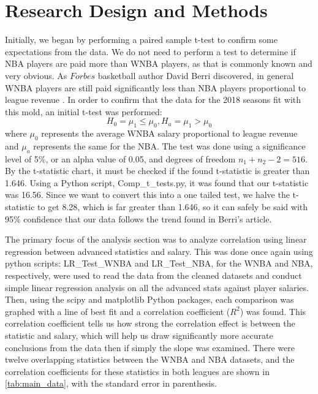 \documentclass[12pt, titlepage]{article}
\begin{document}
\section{Research Design and Methods}
\hspace*{10mm}
Initially, we began by performing a paired sample t-test to confirm some expectations from the data. We do not need to perform a test to 
determine if NBA players are paid more than WNBA players, as that is commonly known and very obvious. As $\textit{Forbes}$ basketball author David Berri 
discovered, in general WNBA players are still paid significantly less than NBA players proportional to league revenue \citep{WNBA_Revenue}. In order to 
confirm that the data for the 2018 seasons fit with this mold, an initial t-test was performed:
$$H_0 = \mu_1 \leq \mu_0, H_a = \mu_1 > \mu_0$$
where $\mu_0$ represents the average WNBA salary proportional to league revenue and $\mu_a$ represents the same for the NBA. The test was done using a 
significance level of  5\%, or an alpha value of 0.05, and degrees of freedom $n_1 + n_2 - 2 = 516$. By the t-statistic chart, it must be checked if the 
found t-statistic is greater than 1.646. Using a Python script, Comp\_t\_tests.py, it was found that our t-statistic was 16.56. Since we want to convert 
this into a one tailed test, we halve the t-statistic to get 8.28, which is far greater than 1.646, so it can safely be said with 95\% confidence that our 
data follows the trend found in Berri's article.
\par
The primary focus of the analysis section was to analyze correlation using linear regression between advanced statistics and salary. This was done once 
again using python scripts: LR\_Test\_WNBA and LR\_Test\_NBA, for the WNBA and NBA, respectively, were used to read the data from the cleaned datasets and 
conduct simple linear regression analysis on all the advanced stats against player salaries. Then, using the scipy and matplotlib Python packages, each 
comparison was graphed with a line of best fit and a correlation coefficient ($R^2$) was found. This correlation coefficient tells us how strong the 
correlation effect is between the statistic and salary, which will help us draw significantly more accurate conclusions from the data then if simply the 
slope was examined. There were twelve overlapping statistics between the WNBA and NBA datasets, and the correlation coefficients for these statistics in 
both leagues are shown in \ref{tab:main_data}, with the standard error in parenthesis.
\end{document}
